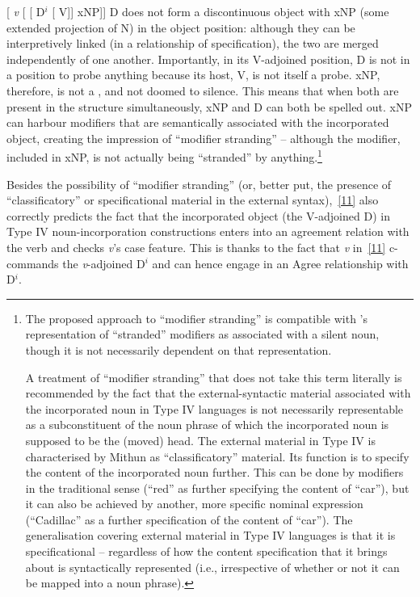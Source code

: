 \documentclass[output=paper]{langsci/langscibook}
\newcommand{\posscite}[1]{\citeauthor{#1}'s \citeyearpar{#1}}
\begin{document}
\begin{refcontext}
\ea  {}[ \emph{v}\tss{\{[+V], \Acc{}, \ldots{}\}} [
[ D$^i$  [ \hspace{-.7ex}V]] xNP]]\label{11}
\z
D does not form a discontinuous object with xNP (some extended projection of N)
in the object position: although they can be interpretively linked (in a
relationship of specification), the two are merged independently of one
another. Importantly, in its V-adjoined position, D is not in a position to
probe anything because its host, V, is not itself a probe. xNP, therefore, is
not a , and not doomed to silence. This means that when both are
present in the structure simultaneously, xNP and D can both be spelled out. xNP
can harbour modifiers that are semantically associated with the incorporated
object, creating the impression of \enquote{modifier stranding} -- although the
modifier, included in xNP, is not actually being \enquote{stranded} by
anything.\footnote{The proposed approach to \enquote{modifier stranding} is
    compatible with \posscite{rosen89} representation of \enquote{stranded}
    modifiers as associated with a silent noun, though it is not necessarily
    dependent on that representation.

A treatment of \enquote{modifier stranding} that does not take this term literally
is recommended by the fact that the external-syntactic material associated with
the incorporated noun in Type IV languages is not necessarily representable as
a subconstituent of the noun phrase of which the incorporated noun is supposed
to be the (moved) head. The external material in Type IV is characterised by
Mithun as \enquote{classificatory} material. Its function is to specify the content
of the incorporated noun further. This can be done by modifiers in the
traditional sense (\enquote{red} as further specifying the content of \enquote{car}), but
it can also be achieved by another, more specific nominal expression
(\enquote{Cadillac} as a further specification of the content of \enquote{car}). The
generalisation covering external material in Type IV languages is that it is
specificational -- regardless of how the content specification that it brings
about is syntactically represented (i.e., irrespective of whether or not it can
be mapped into a noun phrase).}

Besides the possibility of \enquote{modifier stranding} (or, better put, the
presence of \enquote{classificatory} or specificational material in the external
syntax),~\eqref{11} also correctly predicts the fact that the incorporated object
(the V-adjoined D) in Type IV noun-incorporation constructions enters into an
agreement relation with the verb and checks \emph{v}’s case feature. This is
thanks to the fact that \emph{v} in~\eqref{11} c-com\-mands the \emph{v}-adjoined
D$^i$ and can hence engage in an Agree relationship with D$^i$.


\end{refcontext}
\end{document}

